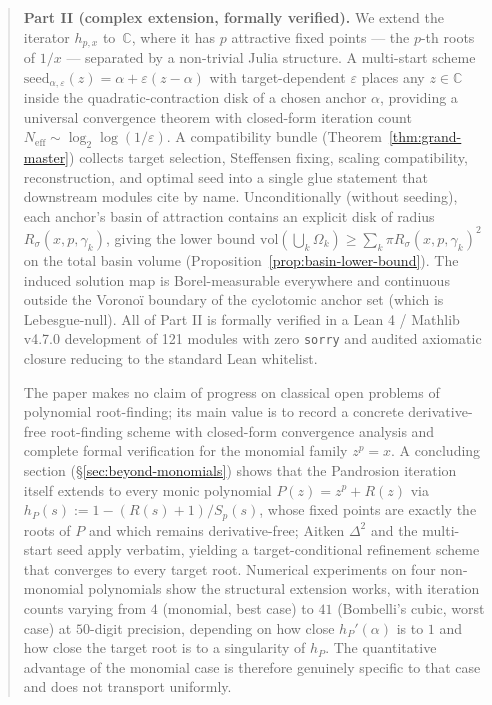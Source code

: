 \documentclass[11pt,a4paper]{article}
\theoremstyle{definition}
\begin{document}
\begin{abstract}
\textbf{Part II (complex extension, formally verified).} We extend the
iterator $h_{p,x}$ to~$\mathbb{C}$, where it has $p$ attractive fixed
points --- the $p$-th roots of $1/x$ --- separated by a non-trivial
Julia structure. A multi-start scheme
$\mathrm{seed}_{\alpha,\varepsilon}(z) = \alpha + \varepsilon(z-\alpha)$
with target-dependent $\varepsilon$ places any $z \in \mathbb{C}$
inside the quadratic-contraction disk of a chosen anchor $\alpha$,
providing a universal convergence theorem with closed-form iteration
count $N_{\mathrm{eff}} \sim \log_2 \log(1/\varepsilon)$. A
compatibility bundle (Theorem~\ref{thm:grand-master}) collects target
selection, Steffensen fixing, scaling compatibility, reconstruction, and
optimal seed into a single glue statement that downstream modules cite
by name.
Unconditionally (without seeding), each anchor's basin of attraction
contains an explicit disk of radius $R_\sigma(x, p, \gamma_k)$, giving
the lower bound $\mathrm{vol}(\bigcup_k \Omega_k) \geq \sum_k \pi R_\sigma(x, p, \gamma_k)^2$
on the total basin volume (Proposition~\ref{prop:basin-lower-bound}). The
induced solution map is Borel-measurable everywhere and continuous
outside the Voronoï boundary of the cyclotomic anchor set (which is
Lebesgue-null). All of Part II is formally verified in a Lean 4 /
Mathlib v4.7.0 development of 121 modules with zero \texttt{sorry}
and audited axiomatic closure reducing to the standard Lean whitelist.

\medskip

The paper makes no claim of progress on classical open problems of
polynomial root-finding; its main value is to record a concrete
derivative-free root-finding scheme with closed-form convergence
analysis and complete formal verification for the monomial family
$z^p = x$. A concluding section (\S\ref{sec:beyond-monomials})
shows that the Pandrosion iteration itself extends to every monic
polynomial $P(z) = z^p + R(z)$ via
$h_P(s) := 1 - (R(s) + 1)/S_p(s)$, whose fixed points are exactly
the roots of $P$ and which remains derivative-free; Aitken $\Delta^2$
and the multi-start seed apply verbatim, yielding a target-conditional
refinement scheme that converges to every target root. Numerical
experiments on four non-monomial polynomials show the structural
extension works, with iteration counts varying from $4$ (monomial,
best case) to $41$ (Bombelli's cubic, worst case) at $50$-digit
precision, depending on how close $h_P'(\alpha)$ is to $1$ and how
close the target root is to a singularity of $h_P$. The quantitative
advantage of the monomial case is therefore genuinely specific to
that case and does not transport uniformly.
\end{abstract}
\end{document}
